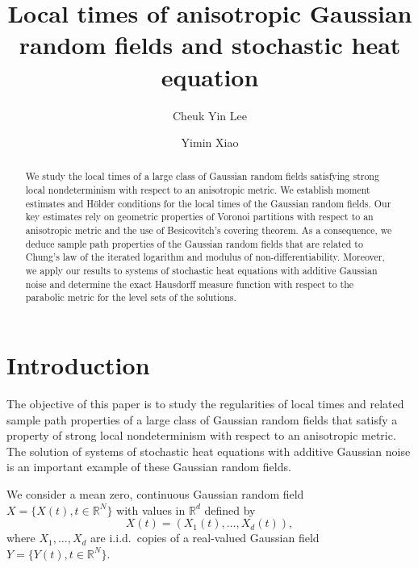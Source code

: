 \documentclass[11pt, reqno]{amsart}
\def\R{{\mathbb R}}
\numberwithin{equation}{section}
\begin{document}
\title[Local times of anisotropic Gaussian random fields]
{Local times of anisotropic Gaussian random fields and stochastic heat equation}
\author{Cheuk Yin Lee \and Yimin Xiao}



\begin{abstract}
We study the local times of a large class of Gaussian random fields satisfying strong local nondeterminism with respect to an anisotropic metric.
We establish moment estimates and H\"{o}lder conditions for the local times of the Gaussian random fields. Our key estimates rely on geometric 
properties of Voronoi partitions with respect to an anisotropic metric and the use of Besicovitch's covering theorem. As a consequence, we 
deduce sample path properties of the Gaussian random fields that are related to Chung's law of the iterated logarithm and modulus of non-differentiability.
Moreover, we apply our results to systems of stochastic heat equations with additive Gaussian noise and determine the exact Hausdorff 
measure function with respect to the parabolic metric for the level sets of the solutions.
\end{abstract}

\maketitle

\section{Introduction}

The objective of this paper is to study the regularities of local times and related sample path properties of a large class of
Gaussian random fields that satisfy a property of strong local nondeterminism with respect to an anisotropic metric. 
The solution of systems 
of stochastic heat equations with additive Gaussian noise is an important example of these Gaussian random fields.

We consider a mean zero, continuous Gaussian random field $X = \{X(t), t \in \R^N\}$ with values in $\R^d$ defined by 
\begin{equation}\label{def:X}
X(t) = (X_1(t), \dots, X_d(t)),
\end{equation}
where $X_1, \dots, X_d$ are i.i.d.~copies of a real-valued Gaussian field $Y = \{ Y(t), t \in \R^N \}$.
\end{document}

